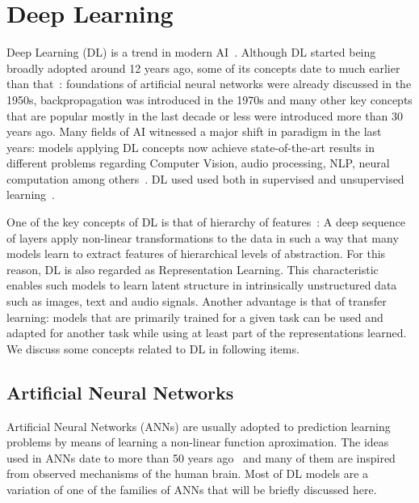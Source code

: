 \documentclass[English]{style/ic-tese-v3}
\begin{document}
\section{Deep Learning}
Deep Learning (DL) is a trend in modern AI~\cite{ref:dl}.
Although DL started being broadly adopted around 12 years ago,
some of its concepts date to much earlier than that~\cite{ref:dl-history}:
foundations of artificial neural networks were already discussed
in the 1950s, backpropagation was introduced in the 1970s
and many other key concepts that are popular mostly in the last decade or less
were introduced more than 30 years ago.
Many fields of AI witnessed a major shift in paradigm
in the last years: models applying DL concepts now achieve state-of-the-art
results in different problems regarding Computer Vision,
audio processing, NLP, neural computation among others~\cite{ref:dl-book}.
DL used used both in supervised and unsupervised learning~\cite{ref:dl}.

One of the key concepts of DL is that of hierarchy of features~\cite{ref:dl}:
A deep sequence of layers apply non-linear transformations to the data
in such a way that many models learn to extract features of hierarchical
levels of abstraction.
For this reason, DL is also regarded as Representation Learning.
This characteristic enables such models to learn latent structure
in intrinsically unstructured data such as images, text and audio signals.
Another advantage is that of transfer learning: models that are
primarily trained for a given task can be used and adapted for another
task while using at least part of the representations learned.
We discuss some concepts related to DL in following items.

\subsection{Artificial Neural Networks}
Artificial Neural Networks (ANNs) are usually adopted to prediction
learning problems by means of learning a non-linear function aproximation.
The ideas used in ANNs date to more than 50 years ago~\cite{ref:perceptron} and many of them
are inspired from observed mechanisms of the human brain.
Most of DL models are a variation of one of the families of ANNs
that will be briefly discussed here.
\end{document}
